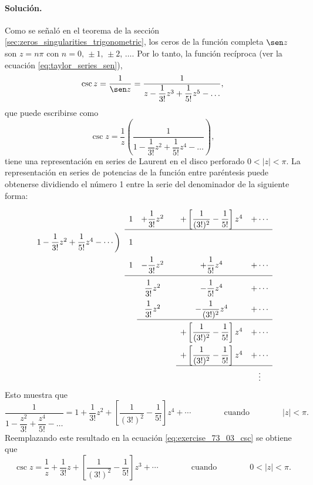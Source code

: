 \documentclass[a4paper]{report}
\begin{document}
\paragraph{Solución.} Como se señaló en el teorema de la sección \ref{sec:zeros_singularities_trigonometric}, los ceros de la función completa \(\sen z\) son \(z=n\pi\) con \(n=0,\,\pm1,\,\pm2,\,\dots\). Por lo tanto, la función recíproca (ver la ecuación \ref{eq:taylor_series_sen}),
\[
 \csc z=\frac{1}{\sen z}=\dfrac{1}{z-\dfrac{1}{3!}z^3+\dfrac{1}{5!}z^5-\dots},
\]
que puede escribirse como
\begin{equation}\label{eq:exercise_73_03_csc}
 \csc z=\frac{1}{z}\left(\dfrac{1}{1-\dfrac{1}{3!}z^2+\dfrac{1}{5!}z^4-\dots}\right), 
\end{equation}
tiene una representación en series de Laurent en el disco perforado \(0<|z|<\pi\). La representación en series de potencias de la función entre paréntesis puede obtenerse dividiendo el número 1 entre la serie del denominador de la siguiente forma:
\[
\setlength\extrarowheight{10pt}
\begin{array}[t]{cccccc}
                       & 1 & +\dfrac{1}{3!}z^2 & & +\left[\dfrac{1}{(3!)^2}-\dfrac{1}{5!}\right]z^4 & +\cdots\\[\medskipamount]
\cline{2-6}
1-\dfrac{1}{3!}z^2+
\dfrac{1}{5!}z^4-\cdots 
                \bigg) & 1  &  &  &   \\
                       & 1  & -\dfrac{1}{3!}z^2 &  & +\dfrac{1}{5!}z^4 & +\cdots \\[\medskipamount]
\cline{2-6}
                       &    & \dfrac{1}{3!}z^2 &  & -\dfrac{1}{5!}z^4 & +\cdots \\
                       &    & \dfrac{1}{3!}z^2 &  & -\dfrac{1}{(3!)^2}z^4 & +\cdots \\[\medskipamount]
\cline{3-6}
                       &    &                  &  & +\left[\dfrac{1}{(3!)^2}-\dfrac{1}{5!}\right]z^4 & +\cdots\\
                       &    &                  &  & +\left[\dfrac{1}{(3!)^2}-\dfrac{1}{5!}\right]z^4 & +\cdots\\[\medskipamount]
\cline{5-6}
                       &    &                  &  &  & \vdots\\
\end{array}
\]
Esto muestra que 
\[
 \dfrac{1}{1-\dfrac{z^2}{3!}+\dfrac{z^4}{5!}-\dots}=1+\frac{1}{3!}z^2+\left[\frac{1}{(3!)^2}-\frac{1}{5!}\right]z^4+\cdots
 \qquad\qquad\textrm{cuando}\qquad\qquad
  |z|<\pi.
\]
Reemplazando este resultado en la ecuación \ref{eq:exercise_73_03_csc} se obtiene que 
\[
 \csc z=\frac{1}{z}+\frac{1}{3!}z+\left[\frac{1}{(3!)^2}-\frac{1}{5!}\right]z^3+\cdots
 \qquad\qquad\textrm{cuando}\qquad\qquad
  0<|z|<\pi.
\]
\end{document}
